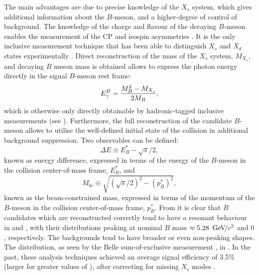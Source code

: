 The main advantages are due to precise knowledge of the $X_s$ system, which gives additional information about the $B$-meson, and a higher-degree of control of background.
The knowledge of the charge and flavour of the decaying $B$-meson enables the measurement of the CP and isospin asymmetries \cite{BaBar:2014czi}.
It is the only inclusive measurement technique that has been able to distinguish $X_s$ and $X_d$ states experimentally \cite{BaBar:2010vgu}.
Direct reconstruction of the mass of the $X_s$ system, $M_{X_s}$, and decaying $B$ meson mass is obtained allows to express the photon energy directly in the signal $B$-meson rest frame:
\begin{equation}
    {\ensuremath{E^B_{\gamma}}} = \frac{M_B^2 - M_{X_s}}{2M_B},
\end{equation}
which is otherwise only directly obtainable by hadronic-tagged inclusive measurements (see ).
Furthermore, the full reconstruction of the candidate $B$-meson allows to utilise the well-defined initial state of the \epem collision in additional background suppression.
Two observables can be defined:
\begin{equation}\label{eq:deltae_inclusive}
    \Delta E \equiv E^*_B - \sqrt{s}/2,
\end{equation}
known as energy difference, expressed in terms of the energy of the $B$-meson in the collision center-of-mass frame, $E^*_B$, and
\begin{equation}\label{eq:mbc_exclusive}
    M_{bc} \equiv \sqrt{(\sqrt{s}/2)^2 - (p^*_B)^2},
\end{equation}
known as the beam-constrained mass, expressed in terms of the momentum of the $B$-meson in the collision center-of-mass frame, $p^*_B$.
From  it is clear that $B$ candidates which are reconstructed correctly tend to have a resonant behaviour in \Mbc and \DeltaE, with their distributions peaking at nominal $B$ mass $\approx5.28~{\mathrm{\,Ge\kern -0.1em V\!/}c^2}$ and $0$, respectively.
The backgrounds tend to have broader or even non-peaking shapes. 
The \Mbc distribution, as seen by the Belle sum-of-exclusive measurement \cite{Belle:2014nmp}, in .
In the past, these analysis techniques achieved an average signal efficiency of 3.5\%~ (larger for greater values of \EB), after correcting for missing $X_s$ modes \cite{Belle:2014nmp}.

